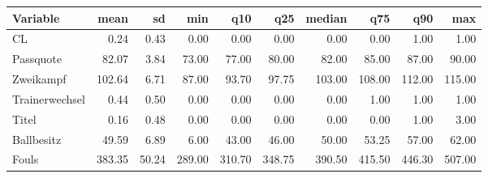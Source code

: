 \begin{table}[ht]
\centering
\begin{tabular}{lrrrrrrrrr}
  \hline
Variable & mean & sd & min & q10 & q25 & median & q75 & q90 & max \\ 
  \hline
CL & 0.24 & 0.43 & 0.00 & 0.00 & 0.00 & 0.00 & 0.00 & 1.00 & 1.00 \\ 
  Passquote & 82.07 & 3.84 & 73.00 & 77.00 & 80.00 & 82.00 & 85.00 & 87.00 & 90.00 \\ 
  Zweikampf & 102.64 & 6.71 & 87.00 & 93.70 & 97.75 & 103.00 & 108.00 & 112.00 & 115.00 \\ 
  Trainerwechsel & 0.44 & 0.50 & 0.00 & 0.00 & 0.00 & 0.00 & 1.00 & 1.00 & 1.00 \\ 
  Titel & 0.16 & 0.48 & 0.00 & 0.00 & 0.00 & 0.00 & 0.00 & 1.00 & 3.00 \\ 
  Ballbesitz & 49.59 & 6.89 & 6.00 & 43.00 & 46.00 & 50.00 & 53.25 & 57.00 & 62.00 \\ 
  Fouls & 383.35 & 50.24 & 289.00 & 310.70 & 348.75 & 390.50 & 415.50 & 446.30 & 507.00 \\ 
   \hline
\end{tabular}
\end{table}
